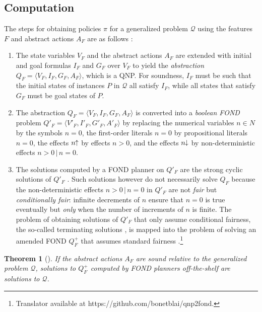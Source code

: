 \documentclass[letterpaper]{article} %
\newcommand{\tup}[1]{\langle #1 \rangle}
\newtheorem{theorem}[definition]{Theorem}
\newcommand{\Q}{\mathcal{Q}}
\newcommand{\pplus}{\hspace{-.05em}\raisebox{.15ex}{\footnotesize$\uparrow$}}
\newcommand{\mminus}{\hspace{-.05em}\raisebox{.15ex}{\footnotesize$\downarrow$}}
\begin{document}
\subsection{Computation}

The steps for obtaining policies $\pi$ for a generalized problem $\Q$
using the features $F$ and abstract actions $A_F$ are as follows \cite{bonet:ijcai2018}:

\begin{enumerate}[1.]
  \item The state variables $V_F$ and the abstract actions $A_F$ are
    extended with initial and goal formulas $I_F$ and $G_F$ over $V_F$
    to yield the \emph{abstraction}  $Q_F=\tup{V_F,I_F,G_F,A_F}$,
    which is a QNP. For soundness, $I_F$ must be such that
    the initial states of instances $P$ in $\Q$ all satisfy $I_F$, while
    all states that satisfy $G_F$ must be goal states of $P$.
%
  \item The abstraction $Q_F=\tup{V_F,I_F,G_F,A_F}$ is converted into a
    \emph{boolean FOND} problem $Q'_F=\tup{V'_F,I'_F,G'_F,A'_F}$ by
    replacing the numerical variables $n\in N$ by the symbols $n=0$,
    the first-order literals $n=0$ by propositional literals  $n=0$, 
    the effects $n\pplus$ by effects $n > 0$, and the
    effects $n\mminus$ by non-deterministic effects $n>0\,|\,n=0$.
%
  \item The solutions computed by a FOND planner on $Q'_F$ are the
    strong cyclic solutions of $Q'_F$ \cite{strong-cyclic}.
    Such solutions however do not necessarily solve $Q_F$ because the
    non-deterministic effects $n>0\,|\,n=0$ in $Q'_F$ are not \emph{fair} but
    \emph{conditionally fair}: infinite decrements of $n$ ensure that 
    $n=0$ is true eventually but \emph{only} when  the number of increments of $n$ is finite.
    The problem of obtaining solutions of $Q'_F$ that only assume conditional
    fairness, the so-called terminating solutions \cite{srivastava:aaai2011},
    is mapped into the problem of solving an amended FOND $Q^+_F$ that
    assumes standard  fairness \cite{bonet:ijcai2017}.\footnote{Translator
    available at  https://github.com/bonetblai/qnp2fond.}
\end{enumerate}


\begin{theorem}[\cite{bonet:ijcai2018}]
If the abstract actions  $A_F$ are sound relative to the generalized problem $\Q$,   solutions  to $Q^+_F$
computed by FOND planners off-the-shelf  are solutions to $\Q$.
\end{theorem}
\end{document}
